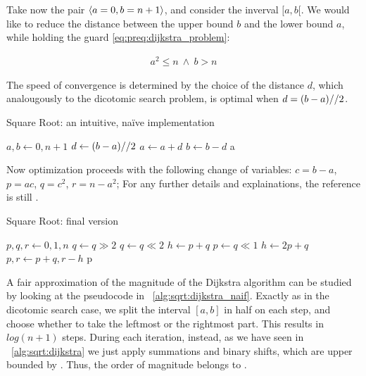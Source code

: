 Take now the pair $\langle a=0, b=n+1\rangle$, and consider the inverval
$[a, b[$. We would like to reduce the distance between the upper bound $b$ and
the lower bound $a$, while holding the guard \ref{eq:preq:dijkstra_problem}:

\begin{align*}
  a^2 \leq n \: \land \: b > n
\end{align*}

The speed of convergence is determined by the choice of the distance $d$, which
analougously to the dicotomic search problem, is optimal when
$d = (b-a) // 2$.

\begin{algorithm}[H]
  \caption{Square Root: an intuitive, na\"ive implementation}
  \label{alg:sqrt:dijkstra_naif}
  \begin{algorithmic}[1]
    \State $a, b \gets 0, n+1$
      \State $d \gets (b-a) // 2$
         $a \gets a+d$
         $b \gets b-d$
      \EndIf
    \EndWhile
    \State \Return a
  \end{algorithmic}
\end{algorithm}

Now optimization proceeds with the following change of variables:
$c = b-a$,
$p = ac$,
$q = c^2$,
$r = n-a^2$;
For any further details and explainations, the reference is still
\cite{Dijkstra:adop}.

\begin{algorithm}[H]
  \caption{Square Root: final version}
  \label{alg:sqrt:dijkstra}
  \begin{algorithmic}[1]
    \State $p, q, r \gets 0, 1, n$
     $q \gets q \gg 2$ \EndWhile
      \State $q \gets q \ll 2$
      \State $h \gets p+q$
      \State $p \gets q \ll 1$
      \State $h \gets 2p + q$
       $p, r \gets p+q, r-h$ \EndIf
    \EndWhile
    \State \Return p
  \end{algorithmic}
\end{algorithm}

A fair approximation of the magnitude of the Dijkstra algorithm can be studied
by looking at the pseudocode in ~\ref{alg:sqrt:dijkstra_naif}. Exactly as in
the dicotomic search case, we split the interval $[a, b]$ in half on each step,
and choose whether to take the leftmost or the rightmost part. This results in
$log(n+1)$ steps. During each iteration, instead, as we have seen in
~\ref{alg:sqrt:dijkstra} we just apply summations and binary shifts, which are
upper bounded by . Thus, the order of magnitude belongs to
.


